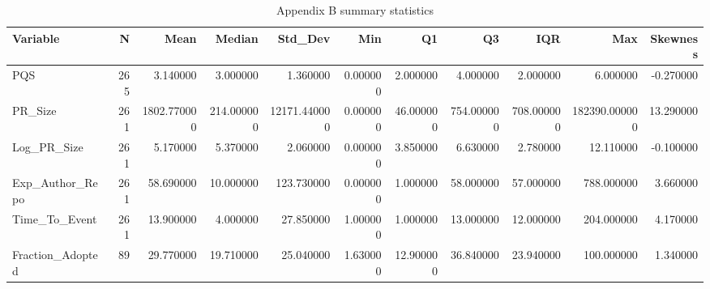 \begin{table}
\caption{Appendix B summary statistics}
\label{tab:appendix-b-summary}
\begin{tabular}{lrrrrrrrrrr}
\toprule
Variable & N & Mean & Median & Std_Dev & Min & Q1 & Q3 & IQR & Max & Skewness \\
\midrule
PQS & 265 & 3.140000 & 3.000000 & 1.360000 & 0.000000 & 2.000000 & 4.000000 & 2.000000 & 6.000000 & -0.270000 \\
PR_Size & 261 & 1802.770000 & 214.000000 & 12171.440000 & 0.000000 & 46.000000 & 754.000000 & 708.000000 & 182390.000000 & 13.290000 \\
Log_PR_Size & 261 & 5.170000 & 5.370000 & 2.060000 & 0.000000 & 3.850000 & 6.630000 & 2.780000 & 12.110000 & -0.100000 \\
Exp_Author_Repo & 261 & 58.690000 & 10.000000 & 123.730000 & 0.000000 & 1.000000 & 58.000000 & 57.000000 & 788.000000 & 3.660000 \\
Time_To_Event & 261 & 13.900000 & 4.000000 & 27.850000 & 1.000000 & 1.000000 & 13.000000 & 12.000000 & 204.000000 & 4.170000 \\
Fraction_Adopted & 89 & 29.770000 & 19.710000 & 25.040000 & 1.630000 & 12.900000 & 36.840000 & 23.940000 & 100.000000 & 1.340000 \\
\bottomrule
\end{tabular}
\end{table}
